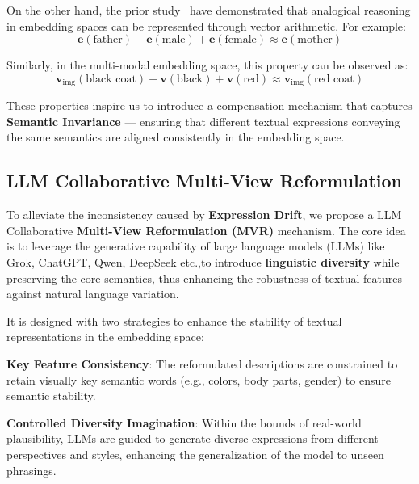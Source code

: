 On the other hand, the prior study~\cite{hu2024empowering,yuan2025poses,yuan2025neighbor} have demonstrated that analogical reasoning in embedding spaces can be represented through vector arithmetic. For example:
\begin{equation}
\mathbf{e}(\text{father}) - \mathbf{e}(\text{male}) + \mathbf{e}(\text{female}) \approx \mathbf{e}(\text{mother})
\end{equation}

Similarly, in the multi-modal embedding space, this property can be observed as:
\begin{equation}
\mathbf{v}_{\text{img}}(\text{black coat}) - \mathbf{v}(\text{black}) + \mathbf{v}(\text{red}) \approx \mathbf{v}_{\text{img}}(\text{red coat})
\end{equation}

These properties inspire us to introduce a compensation mechanism that captures \textbf{Semantic Invariance} — ensuring that different textual expressions conveying the same semantics are aligned consistently in the embedding space.

\subsection{LLM Collaborative Multi-View Reformulation} \label{reformulation}

To alleviate the inconsistency caused by \textbf{Expression Drift}, we propose a LLM Collaborative \textbf{Multi-View Reformulation (MVR)} mechanism. The core idea is to leverage the generative capability of large language models (LLMs) like Grok\cite{grok3}, ChatGPT\cite{openai2024gpt4o}, Qwen\cite{Qwen2.5-VL}, DeepSeek\cite{guo2025deepseek} etc.,to introduce \textbf{linguistic diversity} while preserving the core semantics, thus enhancing the robustness of textual features against natural language variation.

It is designed with two strategies to enhance the stability of textual representations in the embedding space:

\noindent\textbf{Key Feature Consistency}: The reformulated descriptions are constrained to retain visually key semantic words (e.g., colors, body parts, gender) to ensure semantic stability.

\noindent\textbf{Controlled Diversity Imagination}: Within the bounds of real-world plausibility, LLMs are guided to generate diverse expressions from different perspectives and styles, enhancing the generalization of the model to unseen phrasings.


